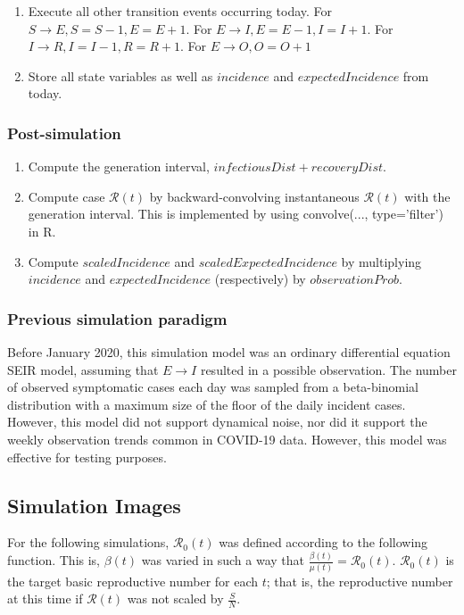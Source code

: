 \documentclass{article}
\newcommand{\nR}{\mathscr{R}}
\begin{document}
\begin{enumerate}
\begin{enumerate}
        \end{enumerate}
    
    \item Execute all other transition events occurring today. For $S \rightarrow E, S=S-1, E=E+1$. For $E \rightarrow I, E=E-1, I=I+1$. For $I \rightarrow R, I = I-1, R = R+1$. For $E \rightarrow O, O = O+1$
    

    
    \item Store all state variables as well as $incidence$ and $expectedIncidence$ from today.
\end{enumerate}

\subsubsection{Post-simulation}
\begin{enumerate}
    \item Compute the generation interval, $infectiousDist + recoveryDist.$ 
    \item Compute case $\nR(t)$ by backward-convolving instantaneous $\nR(t)$ with the generation interval. This is implemented by using convolve(..., type='filter') in R.
    \item Compute $scaledIncidence$ and $scaledExpectedIncidence$ by multiplying $incidence$ and $expectedIncidence$ (respectively) by $observationProb$.
\end{enumerate}


\subsubsection{Previous simulation paradigm}
Before January 2020, this simulation model was an ordinary differential equation SEIR model, assuming that $E \rightarrow I$  resulted in a possible observation. The number of observed symptomatic cases each day was sampled from a beta-binomial distribution with a maximum size of the floor of the daily incident cases. However, this model did not support dynamical noise, nor did it support the weekly observation trends common in COVID-19 data. However, this model was effective for testing purposes.

\clearpage
\subsection{Simulation Images}

For the following simulations, $\nR_0(t)$ was defined according to the following function. This is, $\beta(t)$ was varied in such a way that $\frac{\beta(t)}{\mu(t)} = \nR_0(t)$. $\nR_0(t)$ is the target basic reproductive number for each $t$; that is, the reproductive number at this time if $\nR(t)$ was not scaled by $\frac{S}{N}$.
\end{document}
